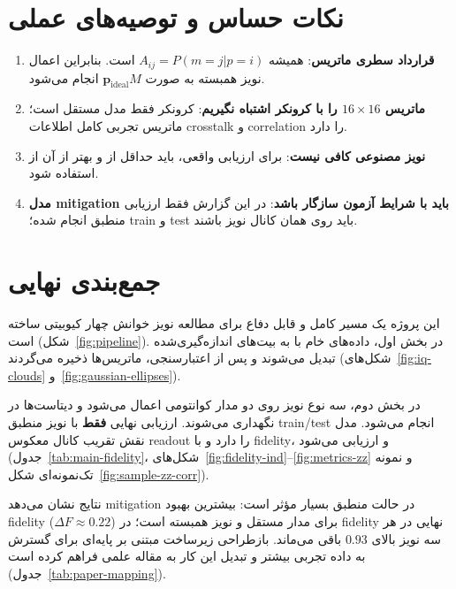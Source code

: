 \section*{نکات حساس و توصیه‌های عملی}

\begin{enumerate}
	\item \textbf{قرارداد سطری ماتریس}: همیشه $A_{ij}=P(m=j|p=i)$ است. بنابراین اعمال نویز همبسته به صورت $\mathbf{p}_{\mathrm{ideal}}M$ انجام می‌شود.
	\item \textbf{ماتریس $16\times16$ را با کرونکر اشتباه نگیریم}: کرونکر فقط مدل مستقل است؛ ماتریس تجربی کامل اطلاعات crosstalk و correlation را دارد.
	\item \textbf{نویز مصنوعی کافی نیست}: برای ارزیابی واقعی، باید حداقل از  و بهتر از آن از  استفاده شود.
	\item \textbf{مدل mitigation باید با شرایط آزمون سازگار باشد}: در این گزارش فقط ارزیابی منطبق انجام شده؛ train و test باید روی همان کانال نویز باشند.
\end{enumerate}

\section*{جمع‌بندی نهایی}

این پروژه یک مسیر کامل و قابل دفاع برای مطالعه نویز خوانش چهار کیوبیتی ساخته است (شکل~\ref{fig:pipeline}). در بخش اول، داده‌های خام   با  به بیت‌های اندازه‌گیری‌شده تبدیل می‌شوند و پس از اعتبارسنجی، ماتریس‌ها ذخیره می‌گردند (شکل‌های~\ref{fig:iq-clouds} و~\ref{fig:gaussian-ellipses}).

در بخش دوم، سه نوع نویز روی دو مدار کوانتومی اعمال می‌شود و دیتاست‌ها در  نگهداری می‌شوند. ارزیابی نهایی \textbf{فقط} با نویز منطبق train/test انجام می‌شود. مدل  نقش تقریب کانال معکوس readout را دارد و با fidelity،  و  ارزیابی می‌شود (جدول~\ref{tab:main-fidelity}، شکل‌های~\ref{fig:fidelity-ind}--\ref{fig:metrics-zz} و نمونه تک‌نمونه‌ای شکل~\ref{fig:sample-zz-corr}).

نتایج نشان می‌دهد mitigation در حالت منطبق بسیار مؤثر است: بیشترین بهبود fidelity ($\Delta F \approx 0.22$) برای مدار مستقل و نویز همبسته است؛ در  fidelity نهایی در هر سه نویز بالای $0.93$ باقی می‌ماند. بازطراحی زیرساخت مبتنی بر   پایه‌ای برای گسترش به داده تجربی بیشتر و تبدیل این کار به مقاله علمی فراهم کرده است (جدول~\ref{tab:paper-mapping}).
